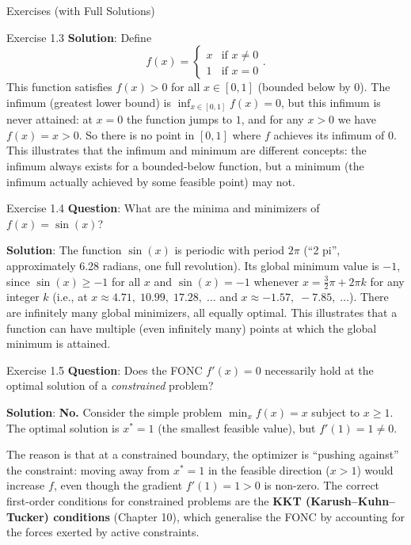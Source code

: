 \documentclass[aspectratio=169,10pt]{beamer}
\begin{document}
\begin{frame}[allowframebreaks]{Exercises (with Full Solutions)}
\begin{block}{Exercise 1.3}
    \medskip
    \textbf{Solution}: Define
    \[
      f(x) = \begin{cases} x & \text{if } x \neq 0 \\ 1 & \text{if } x = 0 \end{cases}.
    \]
    This function satisfies $f(x) > 0$ for all $x \in [0,1]$ (bounded below by $0$).
    The infimum (greatest lower bound) is $\inf_{x \in [0,1]} f(x) = 0$, but this
    infimum is never attained: at $x = 0$ the function jumps to $1$, and for
    any $x > 0$ we have $f(x) = x > 0$.  So there is no point in $[0,1]$
    where $f$ achieves its infimum of $0$.  This illustrates that the infimum
    and minimum are different concepts: the infimum always exists for a
    bounded-below function, but a minimum (the infimum actually achieved by
    some feasible point) may not.
  \end{block}

  \framebreak

  \begin{block}{Exercise 1.4}
    \textbf{Question}: What are the minima and minimizers of $f(x) = \sin(x)$?

    \medskip
    \textbf{Solution}: The function $\sin(x)$ is periodic with period $2\pi$
    (``2 pi'', approximately 6.28 radians, one full revolution).
    Its global minimum value is $-1$, since $\sin(x) \geq -1$ for all $x$
    and $\sin(x) = -1$ whenever $x = \tfrac{3}{2}\pi + 2\pi k$ for any
    integer $k$ (i.e., at $x \approx 4.71,\; 10.99,\; 17.28,\; \ldots$ and
    $x \approx -1.57,\; -7.85,\; \ldots$).
    There are infinitely many global minimizers, all equally optimal.
    This illustrates that a function can have multiple (even infinitely many)
    points at which the global minimum is attained.
  \end{block}

  \begin{block}{Exercise 1.5}
    \textbf{Question}: Does the FONC $f'(x) = 0$ necessarily hold at the
    optimal solution of a \emph{constrained} problem?

    \medskip
    \textbf{Solution}: \textbf{No.}  Consider the simple problem
    $\min_{x} f(x) = x$ subject to $x \geq 1$.
    The optimal solution is $x^* = 1$ (the smallest feasible value), but
    $f'(1) = 1 \neq 0$.

    \medskip
    The reason is that at a constrained boundary, the optimizer is
    ``pushing against'' the constraint: moving away from $x^* = 1$ in the
    feasible direction ($x > 1$) would increase $f$, even though the
    gradient $f'(1) = 1 > 0$ is non-zero.  The correct first-order conditions
    for constrained problems are the \textbf{KKT (Karush--Kuhn--Tucker)
    conditions} (Chapter 10), which generalise the FONC by accounting for
    the forces exerted by active constraints.
  \end{block}


\end{frame}
\end{document}
